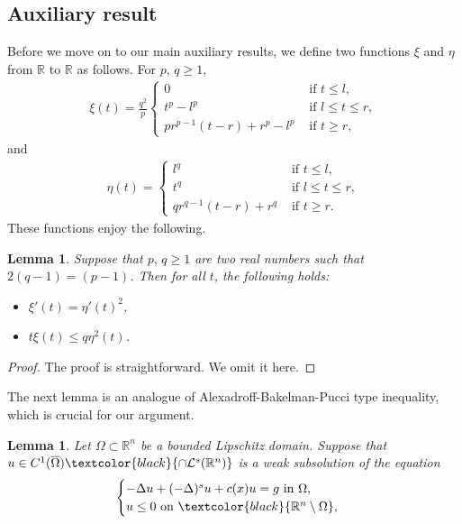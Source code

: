 \documentclass[11pt, notitlepage]{article}
\def\R{\mathbb{R}}
\newcommand{\De} {\Delta}
\newtheorem{Lemma}[Theorem]{Lemma}
\begin{document}
{\subsection{Auxiliary result}
Before we move on to our main auxiliary results, we define two functions $\xi$ and $\eta$ from $\R$ to $\R$ as follows. For $p,\,q\geq 1$,
\begin{align}\label{Babu1}
     \xi(t)=\frac{q^2}{p}\begin{cases}
       0 &\text{ if } t\leq l,\\
       t^p-l^p &\text{ if }l\leq t\leq r,\\
       p r^{p-1}(t-r)+r^p-l^p &\text{ if }t\geq r,
    \end{cases}
\end{align}
and 
\begin{align}\label{Babu2}
     \eta(t)=\begin{cases}
       l^q &\text{ if } t\leq l,\\
       t^q &\text{ if } l\leq t\leq r,\\
       q r^{q-1}(t-r)+r^q &\text{ if }t\geq r.
    \end{cases}
\end{align}
These functions enjoy the following.
\begin{Lemma}\label{Sa2}
    Suppose that $p,\,q\geq 1$ are two real numbers such that $2(q-1)=(p-1)$. Then for all $t$, the following holds:
    \begin{itemize}
        \item[(a)] $\xi'(t)=\eta'(t)^2$,
        \item[(b)] $t\xi(t)\leq q\eta^2(t)$.
    \end{itemize}     
\end{Lemma}
\begin{proof}
    The proof is straightforward. We omit it here.
\end{proof}
The next lemma is an analogue of Alexadroff-Bakelman-Pucci type inequality, which is crucial for our argument.
\begin{Lemma}\label{SML}
     Let $\Omega\subset\R^n$ be a bounded Lipschitz domain. Suppose that $u\in C^1 (\overline{\Omega})\textcolor{black}{\cap \mathcal{L}^s(\R^n)}$ is a weak subsolution of the equation
\begin{align}\label{Sa}
    \begin{cases}
        -\De u+(-\De)^su+c(x)u=g \text{ in }\Omega,\\
        u\leq 0\text{ on }\textcolor{black}{\R^n\setminus\Omega},

\end{cases}
\end{align}
\end{Lemma}}
\end{document}
